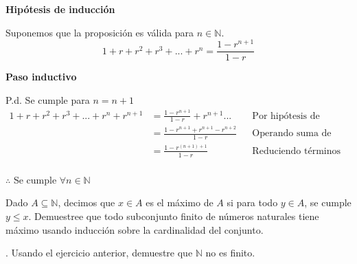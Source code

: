 \documentclass[letterpaper]{article}
\newcommand{\N}{\mathds{N}}
\renewcommand{\*}{\cdot}
\theoremstyle{definition}
\begin{document}
\begin{flushright}
	\textbf{Hipótesis de inducción}
\end{flushright}
Suponemos que la proposición es válida para $n \in \mathbb{N}.$\\
$$1+r+r^2+r^3+...+r^n=\frac{1-r^{n+1}}{1-r}$$
\begin{flushright}
\textbf{Paso inductivo}
\end{flushright}
P.d. Se cumple para $ n=n+1 $
\begin{align*}
	1+r+r^2+r^3+...+r^n+r^{n+1}&=\frac{1-r^{n+1}}{1-r}+r^{n+1}...&& \text{Por hipótesis de inducción}\\
	&=\frac{1-r^{n+1}+r^{n+1}-r^{n+2}}{1-r} &&\text{Operando suma de fracciones}\\
	&=\frac{1-r^{(n+1)+1}}{1-r} && \text{Reduciendo términos}\\
\end{align*}
\begin{center}
	$\therefore$ Se  cumple  $\forall{n} \in \mathbb{N}$\\
\end{center}



\noindent Dado $ A \subseteq \N $, decimos que $ x \in A $ es el máximo de $ A $ si para todo $ y \in A $, se cumple $ y \leq x $. Demuestree que todo subconjunto finito de números naturales tiene máximo usando inducción sobre la cardinalidad del conjunto.

. Usando el ejercicio anterior, demuestre que $ \N $ no es finito.
\end{document}
